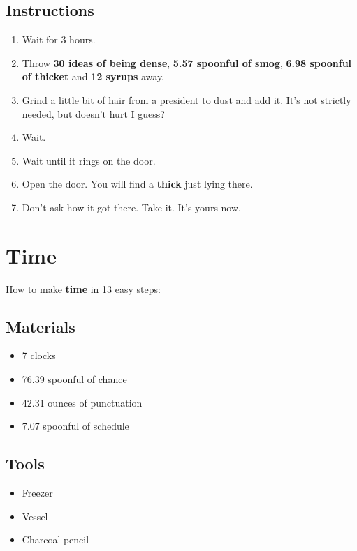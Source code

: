 \documentclass{article}
\begin{document}
\subsection{Instructions}\begin{enumerate}
\item 
Wait for 3 hours.
\item 
Throw \textbf{30 ideas of being dense}, \textbf{5.57 spoonful of smog}, \textbf{6.98 spoonful of thicket} and \textbf{12 syrups} away.
\item 
Grind a little bit of hair from a president to dust and add it. It's not strictly needed, but doesn't hurt I guess?
\item 
Wait.
\item 
Wait until it rings on the door.
\item 
Open the door. You will find a \textbf{thick} just lying there.
\item 
Don't ask how it got there. Take it. It's yours now.
\end{enumerate}
\newpage
\section{Time}How to make \textbf{time} in 13 easy steps:

\subsection{Materials}\begin{itemize}
\item 
7 clocks
\item 
76.39 spoonful of chance
\item 
42.31 ounces of punctuation
\item 
7.07 spoonful of schedule
\end{itemize}
\subsection{Tools}\begin{itemize}
\item 
Freezer
\item 
Vessel
\item 
Charcoal pencil
\end{itemize}
\end{document}
